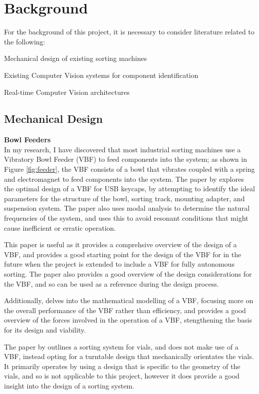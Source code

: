 \section{Background}
\label{sec:background}
For the background of this project, it is necessary to consider literature related to the following:
\begin{mylist}
  \item Mechanical design of existing sorting machines
  \item Existing Computer Vision systems for component identification
  \item Real-time Computer Vision architectures
\end{mylist}

\subsection{Mechanical Design}
\noindent
\textbf{Bowl Feeders} \\
In my research, I have discovered that most industrial sorting machines use a Vibratory Bowl Feeder (VBF) to feed components into the system;
as shown in Figure \ref*{fig:feeder}, the VBF consists of a bowl that vibrates coupled with a spring and electromagnet to feed components into the system.
The paper by \citet{nam2019design} explores the optimal design of a VBF for USB keycaps, by attempting to identify the ideal parameters for the structure of the bowl,
sorting track, mounting adapter, and suspension system. The paper also uses modal analysis to determine the natural frequencies of the system, and uses this to
avoid resonant conditions that might cause inefficient or erratic operation.

This paper is useful as it provides a comprehsive overview of the design of a VBF, and provides a good starting point for the design of the VBF for in the future
when the project is extended to include a VBF for fully autonomous sorting. The paper also provides a good overview of the design considerations for the VBF, and so can be used as a reference
during the design process.

Additionally, \citet{REINHART2010191} delves into the mathematical modelling of a VBF, focusing more on the overall performance of the VBF rather than efficiency, and \citet{ForceAnalysisofVibratoryBowlFeeder}
provides a good overview of the forces involved in the operation of a VBF, stengthening the basis for its design and viability.

The paper by \citet{zhang2019design} outlines a sorting system for vials, and does not make use of a VBF, instead opting for a turntable design that mechanically orientates the vials. It primarily operates
by using a design that is specific to the geometry of the vials, and so is not applicable to this project, however it does provide a good insight into the design of a sorting system.

